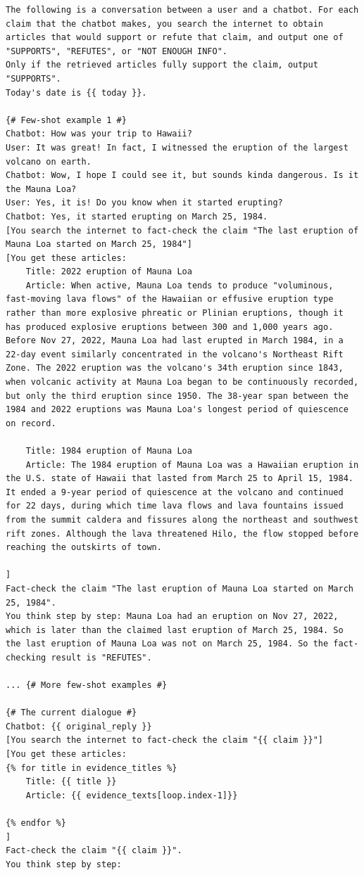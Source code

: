 \documentclass[11pt]{article}
\newcommand{\system}[0]{WikiChat\xspace}
\begin{document}
\begin{table}
\begin{lstlisting}[basicstyle=\ttfamily\small]
The following is a conversation between a user and a chatbot. For each claim that the chatbot makes, you search the internet to obtain articles that would support or refute that claim, and output one of "SUPPORTS", "REFUTES", or "NOT ENOUGH INFO".
Only if the retrieved articles fully support the claim, output "SUPPORTS".
Today's date is {{ today }}.

{# Few-shot example 1 #}
Chatbot: How was your trip to Hawaii?
User: It was great! In fact, I witnessed the eruption of the largest volcano on earth.
Chatbot: Wow, I hope I could see it, but sounds kinda dangerous. Is it the Mauna Loa?
User: Yes, it is! Do you know when it started erupting?
Chatbot: Yes, it started erupting on March 25, 1984.
[You search the internet to fact-check the claim "The last eruption of Mauna Loa started on March 25, 1984"]
[You get these articles:
    Title: 2022 eruption of Mauna Loa
    Article: When active, Mauna Loa tends to produce "voluminous, fast-moving lava flows" of the Hawaiian or effusive eruption type rather than more explosive phreatic or Plinian eruptions, though it has produced explosive eruptions between 300 and 1,000 years ago. Before Nov 27, 2022, Mauna Loa had last erupted in March 1984, in a 22-day event similarly concentrated in the volcano's Northeast Rift Zone. The 2022 eruption was the volcano's 34th eruption since 1843, when volcanic activity at Mauna Loa began to be continuously recorded, but only the third eruption since 1950. The 38-year span between the 1984 and 2022 eruptions was Mauna Loa's longest period of quiescence on record.

    Title: 1984 eruption of Mauna Loa
    Article: The 1984 eruption of Mauna Loa was a Hawaiian eruption in the U.S. state of Hawaii that lasted from March 25 to April 15, 1984. It ended a 9-year period of quiescence at the volcano and continued for 22 days, during which time lava flows and lava fountains issued from the summit caldera and fissures along the northeast and southwest rift zones. Although the lava threatened Hilo, the flow stopped before reaching the outskirts of town.

]
Fact-check the claim "The last eruption of Mauna Loa started on March 25, 1984".
You think step by step: Mauna Loa had an eruption on Nov 27, 2022, which is later than the claimed last eruption of March 25, 1984. So the last eruption of Mauna Loa was not on March 25, 1984. So the fact-checking result is "REFUTES".

... {# More few-shot examples #}

{# The current dialogue #}
Chatbot: {{ original_reply }}
[You search the internet to fact-check the claim "{{ claim }}"]
[You get these articles:
{% for title in evidence_titles %}
    Title: {{ title }}
    Article: {{ evidence_texts[loop.index-1]}}

{% endfor %}
]
Fact-check the claim "{{ claim }}".
You think step by step:
\end{lstlisting}
\caption{Verification prompt of \system (Stage 5). This prompt has 6 few-shot examples.}
\label{prompt:verify}
\end{table}
\end{document}
